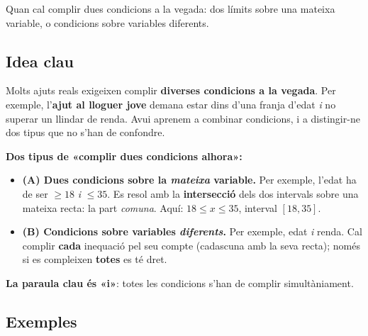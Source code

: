 %
{Quan cal complir dues condicions a la vegada: dos límits sobre una mateixa variable, o condicions sobre variables diferents.}

\subsection{Idea clau}

Molts ajuts reals exigeixen complir \textbf{diverses condicions a la vegada}. Per
exemple, l'\textbf{ajut al lloguer jove} demana estar dins d'una franja d'edat
\emph{i} no superar un llindar de renda. Avui aprenem a combinar condicions, i a
distingir-ne dos tipus que no s'han de confondre.

\begin{idea}
\textbf{Dos tipus de «complir dues condicions alhora»:}
\begin{itemize}[leftmargin=1.4em, itemsep=3pt]
  \item \textbf{(A) Dues condicions sobre la \emph{mateixa} variable.} Per exemple,
        l'edat ha de ser $\ge 18$ \emph{i} $\le 35$. Es resol amb la
        \textbf{intersecció} dels dos intervals sobre una mateixa recta: la part
        \emph{comuna}. Aquí: $18\le x\le 35$, interval $[18,35]$.
  \item \textbf{(B) Condicions sobre variables \emph{diferents}.} Per exemple, edat
        \emph{i} renda. Cal complir \textbf{cada} inequació pel seu compte (cadascuna
        amb la seva recta); només si es compleixen \textbf{totes} es té dret.
\end{itemize}
\textbf{La paraula clau és «i»}: totes les condicions s'han de complir simultàniament.
\end{idea}

\subsection{Exemples}


